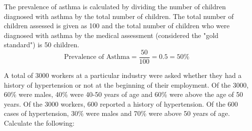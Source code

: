 \documentclass[a4paper]{exam}
\begin{document}
\begin{questions}
    \begin{solution}
        The prevalence of asthma is calculated by dividing the number of children diagnosed with asthma by the total number of children. The total number of children assessed is given as 100 and the total number of children who were diagnosed with asthma by the medical assessment (considered the "gold standard") is 50 children.
        \begin{equation*}
            \text{Prevalence of Asthma} = \frac{50}{100} = 0.5 = 50\%
        \end{equation*}
    \end{solution}


    \question[10]
    A total of 3000 workers at a particular industry were asked whether they had a history of hypertension or not at the beginning of their employment. Of the 3000, 60\% were males, 40\% were 40-50 years of age and 60\% were above the age of 50 years. Of the 3000 workers, 600 reported a history of hypertension. Of the 600 cases of hypertension, 30\% were males and 70\% were above 50 years of age.\\ Calculate the following:
    \begin{solution}
\end{solution}
\end{questions}
\end{document}
